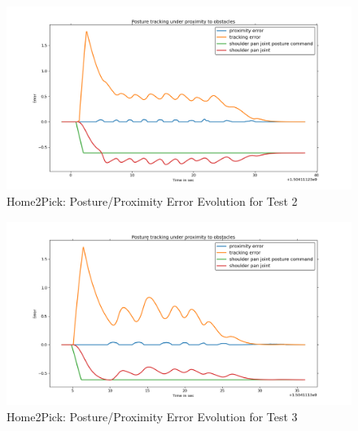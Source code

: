 \begin{figure}[H]
\centering
\includegraphics[width=15cm,height=6cm,center]{chapters/doa/images/delft/test_home2pick/test_1.png}
\caption{Home2Pick: Posture/Proximity Error Evolution for Test 2}
\label{Home2Pick:test1}
\end{figure}
\begin{figure}[H]
\centering
\includegraphics[width=15cm,height=6cm,center]{chapters/doa/images/delft/test_home2pick/test_2.png}
\caption{Home2Pick: Posture/Proximity Error Evolution for Test 3}
\label{Home2Pick:test2}
\end{figure}
